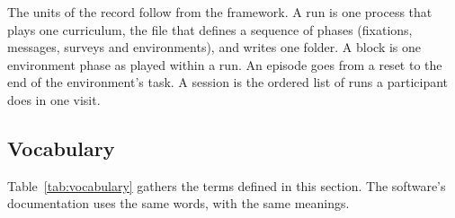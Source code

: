 The units of the record follow from the framework.
A run is one process that plays one curriculum, the file that defines a sequence of phases (fixations, messages, surveys and environments), and writes one folder.
A block is one environment phase as played within a run.
An episode goes from a reset to the end of the environment's task.
A session is the ordered list of runs a participant does in one visit.

\subsection{Vocabulary}
\label{sec:vocabulary}

Table~\ref{tab:vocabulary} gathers the terms defined in this section.
The software's documentation uses the same words, with the same meanings.

